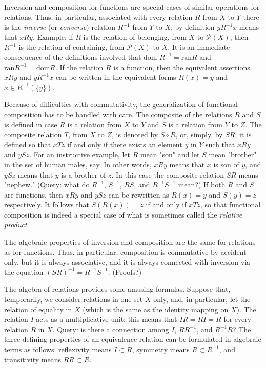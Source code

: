 Inversion and composition for functions are special cases of similar operations for relations. Thus, in particular, associated with every relation $R$ from $X$ to $Y$ there is the \textit{inverse} (or \textit{converse}) relation $R^{-1}$ from $Y$ to $X$; by definition $y R^{-1} x$ means that $xRy$. Example: if $R$ is the relation of belonging, from $X$ to $\mathcal{P}(X)$, then $R^{-1}$ is the relation of containing, from $\mathcal{P}(X)$ to $X$. It is an immediate consequence of the definitions involved that $\text{dom }R^{-1} = \text{ran} R$ and $\text{ran}R^{-1} = \text{dom} R$. If the relation $R$ is a function, then the equivalent assertions $xRy$ and $yR^{-1}x$ can be written in the equivalent forms $R(x) = y$ and $x \in R^{-1}( \{ y \} )$. 

Because of difficulties with commutativity, the generalization of functional composition has to be handled with care. The composite of the relations $R$ and $S$ is defined in case $R$ is a relation from $X$ to $Y$ and $S$ is a relation from $Y$ to $Z$. The composite relation $T$, from $X$ to $Z$, is denoted by $S \circ R$, or, simply, by $SR$; it is defined so that $xTz$ if and only if there exists an element $y$ in $Y$ such that $xRy$ and $ySz$. For an instructive example, let $R$ mean "son" and let $S$ mean "brother" in the set of human males, say. In other words, $xRy$ means that $x$ is son of $y$, and $ySz$ means that $y$ is a brother of $z$. In this case the composite relation $SR$ means "nephew." (Query: what do $R^{-1}$, $S^{-1}$, $RS$, and $R^{-1}S^{-1}$ mean?) If both $R$ and $S$ are functions, then $xRy$ and $ySz$ can be rewritten as $R(x) = y$ and $S(y) = z$ respectively. It follows that $S(R(x)) = z$ if and only if $xTz$, so that functional composition is indeed a special case of what is sometimes called the \textit{relative product}.

The algebraic properties of inversion and composition are the same for relations as for functions. Thus, in particular, composition is commutative by accident only, but it is always associative, and it is always connected with inversion via the equation $(SR)^{-1} = R^{-1}S^{-1}$. (Proofs?) 

The algebra of relations provides some amusing formulas.   Suppose that, temporarily, we consider relations in one set $X$ only, and, in particular, let the relation of equality in $X$ (which is the same as the identity mapping on $X$). The relation $I$ acts as a multiplicative unit; this means that $IR = RI = R$ for every relation $R$ in $X$. Query: is there a connection among $I$, $RR^{-1}$, and $R^{-1}R$? The three defining properties of an equivalence relation can be formulated in algebraic terms as follows: reflexivity means $I \subset R$, symmetry means $R \subset R^{-1}$, and transitivity means $RR \subset R$. 


